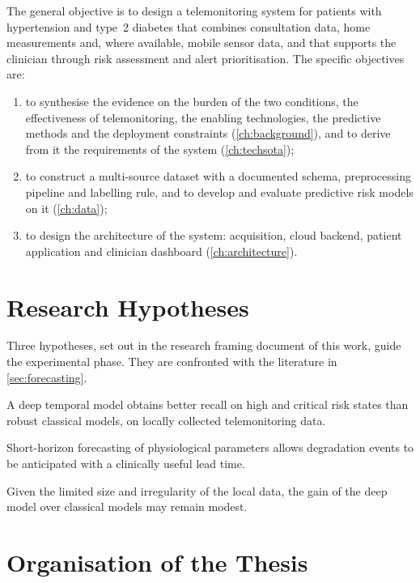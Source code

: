 \documentclass[12pt,a4paper,oneside]{report}
\begin{document}
The general objective is to design a telemonitoring system for patients with hypertension and type~2 diabetes that combines consultation data, home measurements and, where available, mobile sensor data, and that supports the clinician through risk assessment and alert prioritisation. The specific objectives are:
\begin{enumerate}[nosep]
  \item to synthesise the evidence on the burden of the two conditions, the effectiveness of telemonitoring, the enabling technologies, the predictive methods and the deployment constraints (\cref{ch:background}), and to derive from it the requirements of the system (\cref{ch:techsota});
  \item to construct a multi-source dataset with a documented schema, preprocessing pipeline and labelling rule, and to develop and evaluate predictive risk models on it (\cref{ch:data});
  \item to design the architecture of the system: acquisition, cloud backend, patient application and clinician dashboard (\cref{ch:architecture}).
\end{enumerate}

\section{Research Hypotheses}\label{sec:intro-hypotheses}

Three hypotheses, set out in the research framing document of this work, guide the experimental phase. They are confronted with the literature in \cref{sec:forecasting}.
\begin{description}[nosep]
  \item[H1.] A deep temporal model obtains better recall on high and critical risk states than robust classical models, on locally collected telemonitoring data.
  \item[H2.] Short-horizon forecasting of physiological parameters allows degradation events to be anticipated with a clinically useful lead time.
  \item[H3.] Given the limited size and irregularity of the local data, the gain of the deep model over classical models may remain modest.
\end{description}

\section{Organisation of the Thesis}\label{sec:intro-organisation}
\end{document}
